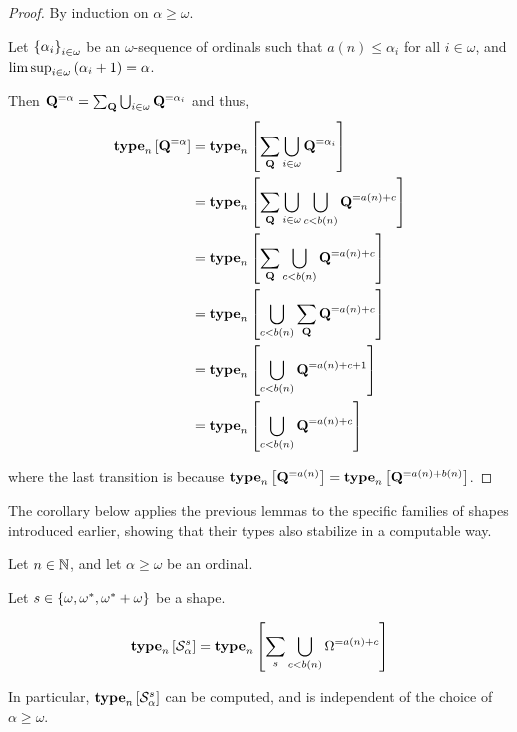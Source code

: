 \begin{proof}
    By induction on $\alpha \ge \omega$.

    Let $\left\{ {\alpha_i} \right\}_{i \in \omega}$ be an $\omega$-sequence of ordinals
    such that $a(n) \le \alpha_i$ for all $i \in \omega$,
    and $\limsup_{i \in \omega} \left( {\alpha_i + 1} \right) = \alpha$.

    Then $\mathbf{Q}^{= \alpha} = \sum_{\mathbf{Q}}{\bigcup_{i \in \omega} \mathbf{Q}^{= \alpha_i}}$ and thus,
    \begin{align*}
        \mathbf{type}_{n} \left[ {\mathbf{Q}^{= \alpha}} \right]
        &= \mathbf{type}_{n} \left[ {\sum_{\mathbf{Q}} \bigcup_{i \in \omega} \mathbf{Q}^{= \alpha_i}} \right] \\
        &= \mathbf{type}_{n} \left[ {\sum_{\mathbf{Q}} \bigcup_{i \in \omega} \bigcup_{c < b(n)}{\mathbf{Q}^{= a(n) + c}}} \right] \\
        &= \mathbf{type}_{n} \left[ {\sum_{\mathbf{Q}} \bigcup_{c < b(n)}{\mathbf{Q}^{= a(n) + c}}} \right] \\
        &= \mathbf{type}_{n} \left[ {\bigcup_{c < b(n)}{\sum_{\mathbf{Q}} \mathbf{Q}^{= a(n) + c}}} \right] \\
        &= \mathbf{type}_{n} \left[ {\bigcup_{c < b(n)}{\mathbf{Q}^{= a(n) + c + 1}}} \right] \\
        &= \mathbf{type}_{n} \left[ {\bigcup_{c < b(n)}{\mathbf{Q}^{= a(n) + c}}} \right]
    \end{align*}

    where the last transition is because $\mathbf{type}_{n} \left[ {\mathbf{Q}^{= a(n)}} \right] = \mathbf{type}_{n} \left[ {\mathbf{Q}^{= a(n) + b(n)}} \right]$.
\end{proof}

The corollary below applies the previous lemmas to the specific families of shapes introduced earlier, showing that their
types also stabilize in a computable way.

\begin{corollary}
    Let $n \in \mathbb{N}$, and let $\alpha \ge \omega$ be an ordinal.

    Let $s \in \left\{ {\omega, \omega^\ast, \omega^\ast + \omega} \right\}$ be a shape.

    \[
        \mathbf{type}_{n} \left[ {\mathcal{S}^{s}_{\alpha}} \right]
        = \mathbf{type}_{n} \left[ {\sum_{s} {\bigcup_{c < b(n)}{\Omega^{= a(n) + c}}}} \right]
    \]

    In particular, $\mathbf{type}_{n} \left[ {\mathcal{S}^{s}_{\alpha}} \right]$ can be
    computed, and is independent of the choice of $\alpha \ge \omega$.
\end{corollary}

